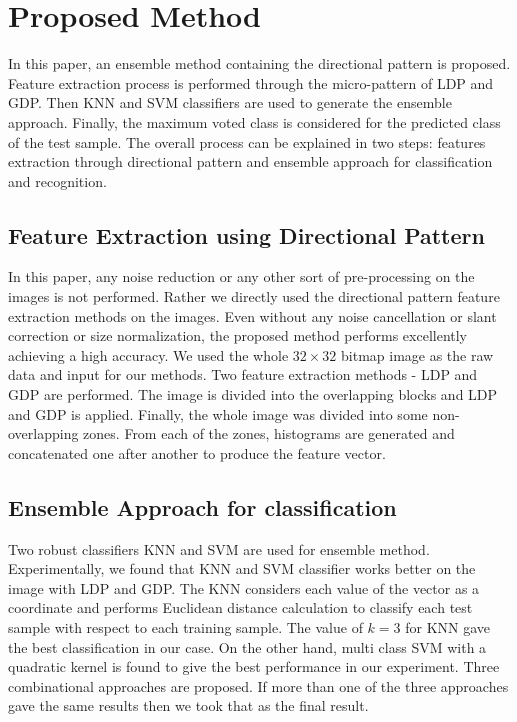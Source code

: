 \documentclass[conference]{IEEEtran}
\begin{document}
\section{Proposed Method}
In this paper, an ensemble method containing the directional pattern is proposed. Feature extraction process is performed through the micro-pattern of LDP and GDP. Then KNN and SVM classifiers are used to generate the ensemble approach. Finally, the maximum voted class is considered for the predicted class of the test sample. The overall process can be explained in two steps: features extraction through directional pattern and ensemble approach for classification and recognition.

\subsection{Feature Extraction using Directional Pattern}
In this paper, any noise reduction or any other sort of pre-processing on the images is not performed. Rather we directly used the directional pattern feature extraction methods on the images. Even without any noise cancellation or slant correction or size normalization, the proposed method performs excellently achieving a high accuracy. We used the whole $32\times32$ bitmap image as the raw data and input for our methods. Two feature extraction methods - LDP and GDP are performed. The image is divided into the overlapping blocks and LDP and GDP is applied. Finally, the whole image was divided into some non-overlapping zones. From each of the zones, histograms are generated and concatenated one after another to produce the feature vector. 

\subsection{Ensemble Approach for classification}
Two robust classifiers KNN \cite{1967KNN} and SVM \cite{1995SVM} are used for ensemble method. Experimentally, we found that KNN and SVM classifier works better on the image with LDP and GDP. The KNN considers each value of the vector as a coordinate and performs Euclidean distance calculation to classify each test sample with respect to each training sample. The value of $k = 3$ for KNN gave the best classification in our case. On the other hand, multi class SVM with a quadratic kernel is found to give the best performance in our experiment. Three combinational approaches are proposed. If more than one of the three approaches gave the same results then we took that as the final result.
\end{document}
